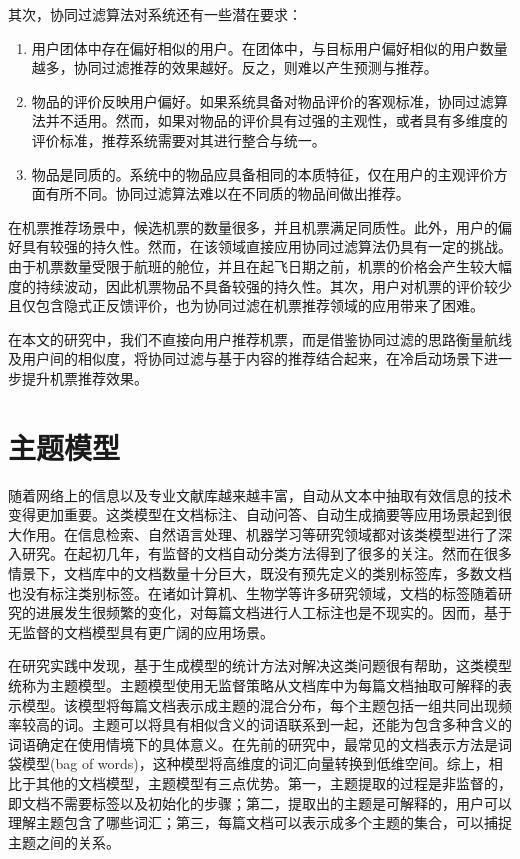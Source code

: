 其次，协同过滤算法对系统还有一些潜在要求：

\begin{enumerate}
	\item 用户团体中存在偏好相似的用户。在团体中，与目标用户偏好相似的用户数量越多，协同过滤推荐的效果越好。反之，则难以产生预测与推荐。
	\item 物品的评价反映用户偏好。如果系统具备对物品评价的客观标准，协同过滤算法并不适用。然而，如果对物品的评价具有过强的主观性，或者具有多维度的评价标准，推荐系统需要对其进行整合与统一。
	\item 物品是同质的。系统中的物品应具备相同的本质特征，仅在用户的主观评价方面有所不同。协同过滤算法难以在不同质的物品间做出推荐。
\end{enumerate}

在机票推荐场景中，候选机票的数量很多，并且机票满足同质性。此外，用户的偏好具有较强的持久性。然而，在该领域直接应用协同过滤算法仍具有一定的挑战。由于机票数量受限于航班的舱位，并且在起飞日期之前，机票的价格会产生较大幅度的持续波动，因此机票物品不具备较强的持久性。其次，用户对机票的评价较少且仅包含隐式正反馈评价，也为协同过滤在机票推荐领域的应用带来了困难。

在本文的研究中，我们不直接向用户推荐机票，而是借鉴协同过滤的思路衡量航线及用户间的相似度，将协同过滤与基于内容的推荐结合起来，在冷启动场景下进一步提升机票推荐效果。

\section{主题模型}

随着网络上的信息以及专业文献库越来越丰富，自动从文本中抽取有效信息的技术变得更加重要。这类模型在文档标注、自动问答、自动生成摘要等应用场景起到很大作用。在信息检索、自然语言处理、机器学习等研究领域都对该类模型进行了深入研究。在起初几年，有监督的文档自动分类方法得到了很多的关注\cite{yang1999evaluation}。然而在很多情景下，文档库中的文档数量十分巨大，既没有预先定义的类别标签库，多数文档也没有标注类别标签。在诸如计算机、生物学等许多研究领域，文档的标签随着研究的进展发生很频繁的变化，对每篇文档进行人工标注也是不现实的。因而，基于无监督的文档模型具有更广阔的应用场景。

在研究实践中发现，基于生成模型\cite{zhong2005generative,hofmann1999probabilistic,blei2003latent,minka2002expectation}的统计方法对解决这类问题很有帮助，这类模型统称为主题模型。主题模型使用无监督策略从文档库中为每篇文档抽取可解释的表示模型。该模型将每篇文档表示成主题的混合分布，每个主题包括一组共同出现频率较高的词。主题可以将具有相似含义的词语联系到一起，还能为包含多种含义的词语确定在使用情境下的具体意义。在先前的研究中，最常见的文档表示方法是词袋模型(bag of words)\cite{zhang2010understanding}，这种模型将高维度的词汇向量转换到低维空间。综上，相比于其他的文档模型，主题模型有三点优势。第一，主题提取的过程是非监督的，即文档不需要标签以及初始化的步骤；第二，提取出的主题是可解释的，用户可以理解主题包含了哪些词汇；第三，每篇文档可以表示成多个主题的集合，可以捕捉主题之间的关系。


